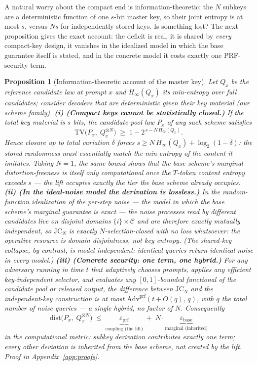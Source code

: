 \documentclass{article} %
\newtheorem{proposition}{Proposition}
\begin{document}
A natural worry about the compact end is information-theoretic: the $N$
subkeys are a deterministic function of one $s$-bit master key, so their
joint entropy is at most $s$, versus $Ns$ for independently stored keys. Is
something lost? The next proposition gives the exact account: the deficit is
real, it is shared by \emph{every} compact-key design, it vanishes in the
idealized model in which the base guarantee itself is stated, and in the
concrete model it costs exactly one PRF-security term.

\begin{proposition}[Information-theoretic account of the master key]\label{prop:itcost}
Let $Q_x$ be the reference candidate law at prompt $x$ and $H_\infty(Q_x)$
its min-entropy over full candidates; consider decoders that are
deterministic given their key material (our scheme family).
\textbf{(i) (Compact keys cannot be statistically closed.)} If the total key
material is $s$ bits, the candidate-pool law $P_x$ of \emph{any} such scheme
satisfies
\[
\mathrm{TV}\big(P_x,\;Q_x^{\otimes N}\big)\;\ge\;1-2^{\,s-N\,H_\infty(Q_x)} .
\]
Hence closure up to total variation $\delta$ forces
$s\ge N\,H_\infty(Q_x)+\log_2(1-\delta)$: the stored randomness must
essentially match the min-entropy of the content it imitates. Taking $N{=}1$,
the same bound shows that the base scheme's \emph{marginal}
distortion-freeness is itself only computational once the $T$-token content
entropy exceeds $s$ --- the lift occupies exactly the tier the base scheme
already occupies.
\textbf{(ii) (In the ideal-noise model the derivation is lossless.)} In the
random-function idealization of the per-step noise --- the model in which the
base scheme's marginal guarantee is exact --- the noise processes read by
different candidates live on disjoint domains $\{i\}\times\mathcal C$ and
are therefore \emph{exactly} mutually independent, so $\mathrm{JC}_N$ is
exactly $N$-selection-closed with no loss whatsoever: the operative resource
is domain disjointness, not key entropy. (The shared-key collapse, by
contrast, is model-independent: identical queries return identical noise in
every model.)
\textbf{(iii) (Concrete security: one term, one hybrid.)} For any adversary
running in time $t$ that adaptively chooses prompts, applies any efficient
key-independent selector, and evaluates any $[0,1]$-bounded functional of the
candidate pool or released output, the difference between $\mathrm{JC}_N$
and the independent-key construction is at most
$\mathrm{Adv}^{\mathrm{prf}}(t+O(q),\,q)$, with $q$ the total number of
noise queries --- a single hybrid, no factor of $N$. Consequently
\[
\mathrm{dist}\big(P_x,\;Q_x^{\otimes N}\big)\;\le\;
\underbrace{\varepsilon_{\mathrm{prf}}}_{\text{coupling (the lift)}}
\;+\;N\cdot\underbrace{\varepsilon_{\mathrm{base}}}_{\text{marginal (inherited)}}
\]
in the computational metric: subkey derivation contributes exactly one term;
every other deviation is inherited from the base scheme, not created by the
lift. Proof in Appendix~\ref{app:proofs}.
\end{proposition}
\end{document}
